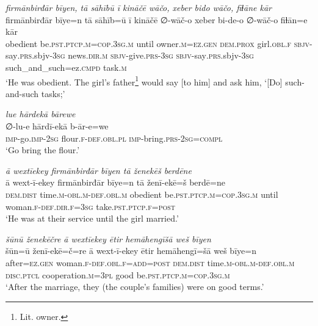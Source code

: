 \ea \label{RE.18}
\textit{firmānbirđār bīyen, tā sāhībū ī kināčē wāčo, xeber bido wāčo, fiɫāne kār} \\ 
\gll firmānbirđār bīye=n tā sāhīb=ū ī kināčē ∅-wāč-o xeber bi-de-o ∅-wāč-o fiɫān=e kār \\ 
 obedient be\textsc{.pst}\textsc{.ptcp}\textsc{.m}\textsc{=cop}\textsc{.3sg}\textsc{.m} until owner\textsc{.m}\textsc{=ez.gen} \textsc{dem.prox} girl\textsc{.obl}\textsc{.f} \textsc{sbjv-}say\textsc{.prs}.sbjv\textsc{-3sg} news\textsc{.dir}\textsc{.m} \textsc{sbjv-}give\textsc{.prs}\textsc{-3sg} \textsc{sbjv-}say\textsc{.prs}.sbjv\textsc{-3sg} such\_and\_such=ez\textsc{.cmpd} task\textsc{.m} \\ 
\glt `He was obedient. The girl’s father\footnote{Lit. owner.} would say [to him] and ask him, ‘[Do] such-and-such tasks;'
\z 
 
\ea \label{RE.19}
\textit{lue hārdekā bārewe} \\ 
\gll ∅-lu-e hārdī-ekā b-ār-e=we \\ 
 \textsc{imp-}go.\textsc{imp-}\textsc{2sg} flour\textsc{.f}\textsc{-def}\textsc{.obl}\textsc{.pl} \textsc{imp-}bring\textsc{.prs}-\textsc{2sg}\textsc{=compl} \\ 
\glt `Go bring the flour.'
\z 
 
\ea \label{RE.21}
\textit{ā wextīekey firmānbirđār bīyen tā ženekēš berdēne} \\ 
\gll ā wext-ī-ekey firmānbirđār bīye=n tā ženī-ekē=š berdē=ne \\ 
 \textsc{dem.dist} time\textsc{.m}\textsc{-obl}\textsc{.m}\textsc{-def}\textsc{.obl}\textsc{.m} obedient be\textsc{.pst}\textsc{.ptcp}\textsc{.m}\textsc{=cop}\textsc{.3sg}\textsc{.m} until woman\textsc{.f}\textsc{-def}\textsc{.dir}\textsc{.f}\textsc{=3sg} take\textsc{.pst}\textsc{.ptcp}\textsc{.f}\textsc{=\textsc{post}} \\ 
\glt `He was at their service until the girl married.'
\z 
 
\ea \label{RE.22}
\textit{šūnū ženekēčre ā wextīekey ētir hemāhengīšā weš bīyen} \\ 
\gll šūn=ū ženī-ekē=č=re ā wext-ī-ekey ētir hemāhengī=šā weš bīye=n \\ 
 after\textsc{=ez.gen} woman\textsc{.f}\textsc{-def}\textsc{.obl}\textsc{.f}\textsc{=add}\textsc{=\textsc{post}} \textsc{dem.dist} time\textsc{.m}\textsc{-obl}\textsc{.m}\textsc{-def}\textsc{.obl}\textsc{.m} \textsc{disc.ptcl} cooperation\textsc{.m}\textsc{=3pl} good be\textsc{.pst}\textsc{.ptcp}\textsc{.m}\textsc{=cop}\textsc{.3sg}\textsc{.m} \\ 
\glt `After the marriage, they (the couple's families) were on good terms.'
\z 
 
